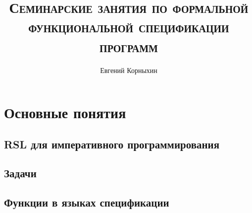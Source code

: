 \documentclass[14pt, twoside]{extreport}
\author{Евгений Корныхин}
\title{\huge{\textbf{\textsc{Семинарские занятия по формальной функциональной спецификации программ}}}}
\newcounter{problem_type}[chapter]
\begin{document}
\maketitle

\tableofcontents





\chapter{Основные понятия}

\section{RSL для императивного программирования}

    

    \section*{Задачи}

    

\section{Функции в языках спецификации}
\end{document}
